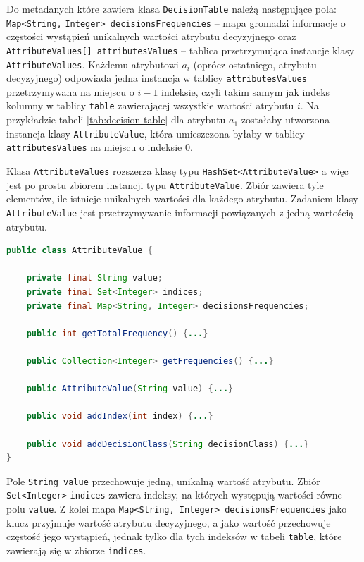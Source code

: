 \documentclass[12pt]{article}
\begin{document}
Do metadanych które zawiera klasa \verb|DecisionTable| należą następujące pola: \verb|Map<String,| \verb|Integer> decisionsFrequencies| -- mapa gromadzi informacje o częstości wystąpień
unikalnych wartości atrybutu decyzyjnego oraz \verb|AttributeValues[] attributesValues| -- tablica przetrzymująca instancje klasy \verb|AttributeValues|. Każdemu
atrybutowi $a_i$ (oprócz ostatniego, atrybutu decyzyjnego) odpowiada jedna instancja w tablicy \verb|attributesValues| przetrzymywana na miejscu o $i-1$ indeksie, czyli
takim samym jak indeks kolumny w tablicy \verb|table| zawierającej wszystkie wartości atrybutu $i$. Na przykładzie tabeli \ref{tab:decision-table} dla atrybutu $a_1$ zostałaby utworzona instancja klasy \verb|AttributeValue|, która umieszczona byłaby w tablicy
\verb|attributesValues| na miejscu o indeksie $0$.

Klasa \verb|AttributeValues| rozszerza klasę typu \verb|HashSet<AttributeValue>| a więc jest po prostu zbiorem instancji typu \verb|AttributeValue|.
Zbiór zawiera tyle elementów, ile istnieje unikalnych wartości dla każdego atrybutu. Zadaniem klasy \verb|AttributeValue| jest przetrzymywanie informacji
powiązanych z jedną wartością atrybutu.

\begin{lstlisting}[language=java, caption=Skrócona implementacja klasy AttributeValue,frame=single,label={lst:attribute-value-class}]
public class AttributeValue {

    private final String value;
    private final Set<Integer> indices;
    private final Map<String, Integer> decisionsFrequencies;

    public int getTotalFrequency() {...}

    public Collection<Integer> getFrequencies() {...}

    public AttributeValue(String value) {...}

    public void addIndex(int index) {...}

    public void addDecisionClass(String decisionClass) {...}
}
\end{lstlisting}
\newpage

Pole \verb|String value| przechowuje jedną, unikalną wartość atrybutu. Zbiór \verb|Set<Integer>| \verb|indices| zawiera indeksy, na których występują
wartości równe polu \verb|value|. Z kolei mapa \verb|Map<String, Integer> decisionsFrequencies| jako klucz przyjmuje wartość atrybutu decyzyjnego,
a jako wartość przechowuje częstość jego wystąpień, jednak tylko dla tych indeksów w tabeli \verb|table|, które zawierają się w zbiorze \verb|indices|.
\end{document}
